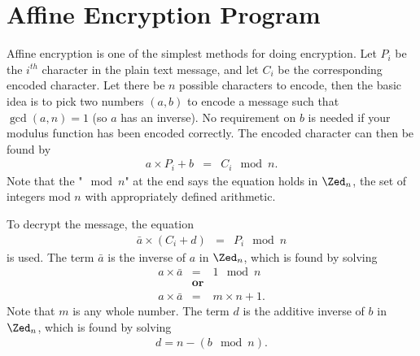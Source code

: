 \section{Affine Encryption Program}\label{s-stack-affine}

Affine encryption is one of the simplest methods for doing encryption.  Let $P_i$ be the $i^{th}$ character in the plain text message, and let $C_i$ be the corresponding encoded character.  Let there be $n$ possible characters to encode, then the basic idea is to pick two numbers $(a,b)$ to encode a message such that $\gcd(a,n)=1$ (so $a$ has an inverse).  No requirement on $b$ is needed if your modulus function has been encoded correctly.  The encoded character can then be found by
\begin{eqnarray*}
  a\times P_i +b &=& C_i \mod n.
\end{eqnarray*}
Note that the "$\mod n$" at the end says the equation holds in $\Zed_n$, the set of integers mod $n$ with appropriately defined arithmetic.

To decrypt the message, the equation
\begin{eqnarray*}
  \bar a\times (C_i +d) &=& P_i \mod n
\end{eqnarray*}
is used.  The term $\bar a$ is the inverse of $a$ in $\Zed_n$, which is found by solving
\begin{eqnarray*}
  a\times\bar a &=& 1 \mod n \\
   & \textbf{or} & \\
  a\times\bar a &=& m\times n+1.
\end{eqnarray*}
Note that $m$ is any whole number.  The term $d$ is the additive inverse of $b$ in $\Zed_n$, which is found by solving
\begin{eqnarray*}
  d=n-(b \mod n).
\end{eqnarray*}

